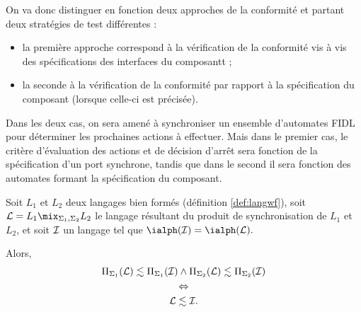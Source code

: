 On va donc distinguer en fonction deux approches de la conformit\'e
et partant deux strat\'egies de test diff\'erentes :
\begin{itemize}
  \item la premi\`ere approche correspond \`a la v\'erification de
  la conformit\'e vis \`a vis des sp\'ecifications des interfaces
  du composantt ;
\item la seconde \`a la v\'erification de la conformit\'e par
  rapport \`a la sp\'ecification du composant (lorsque celle-ci est
  pr\'ecis\'ee).
\end{itemize}
Dans les deux cas, on sera amen\'e \`a synchroniser un ensemble
d'automates \textsf{FIDL} pour d\'eterminer les prochaines actions
\`a effectuer. Mais dans le premier cas, le crit\`ere
d'\'evaluation des actions et de d\'ecision d'arr\^et sera
fonction de la sp\'ecification d'un port synchrone, tandis que dans
le second il sera fonction des automates formant la sp\'ecification
du composant.

\begin{prop}
\label{prop:mix-contrat}
    Soit $L_1$ et $L_2$ deux langages bien form\'es (d\'efinition
    \ref{def:langwf}), soit ${\cal L} = L_1 \mix_{\Sigma_1,\Sigma_2} L_2$ le
    langage r\'esultant du produit de synchronisation de $L_1$ et
    $L_2$, et soit $\cal I$ un
    langage tel que $\ialph({\cal I}) =\ialph({\cal L}).$ 

Alors, 
\begin{gather}    
\label{eq:mix-contrat1}    \Pi_{\Sigma_1}({\cal L}) \lesssim
\Pi_{\Sigma_1}({\cal I}) \wedge
 \Pi_{\Sigma_2}({\cal L})\lesssim \Pi_{\Sigma_2}({\cal I}) \\
\notag    \Leftrightarrow \\
\label{eq:mix-contrat2} {\cal L}\lesssim {\cal I}.
\end{gather}
\end{prop}

